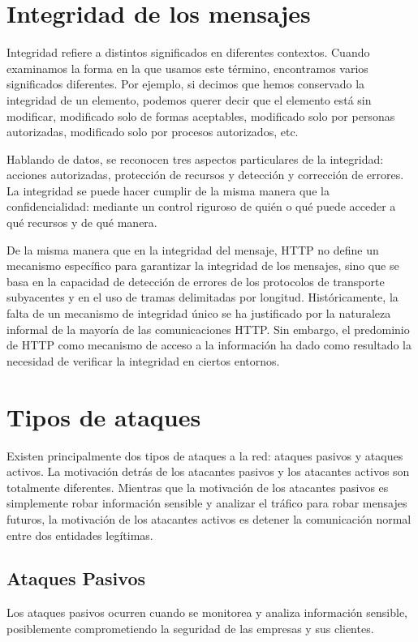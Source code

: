 \section{Integridad de los mensajes}
Integridad refiere a distintos significados en diferentes contextos. Cuando examinamos 
la forma en la que usamos este término, encontramos varios significados diferentes. 
Por ejemplo, si decimos que hemos conservado la integridad de un elemento, podemos 
querer decir que el elemento está sin modificar, modificado solo de formas aceptables, 
modificado solo por personas autorizadas, modificado solo por procesos autorizados, 
etc.

Hablando de datos, se reconocen tres aspectos particulares de la integridad: 
acciones autorizadas, protección de recursos y detección y corrección de errores. 
La integridad se puede hacer cumplir de la misma manera que la confidencialidad: 
mediante un control riguroso de quién o qué puede acceder a qué recursos y de qué 
manera.

De la misma manera que en la integridad del mensaje,
HTTP no define un mecanismo específico para garantizar la integridad de los 
mensajes, sino que se basa en la capacidad de detección de errores de los 
protocolos de transporte subyacentes y en el uso de tramas delimitadas por 
longitud. Históricamente, la falta de un mecanismo de integridad único se 
ha justificado por la naturaleza informal de la mayoría de las comunicaciones 
HTTP. Sin embargo, el predominio de HTTP como mecanismo de acceso a la 
información ha dado como resultado la necesidad de verificar la integridad
en ciertos entornos.


\section{Tipos de ataques}
Existen principalmente dos tipos de ataques a la red: ataques pasivos y 
ataques activos. La motivación detrás de los atacantes pasivos y los atacantes 
activos son totalmente diferentes. Mientras que la motivación de los atacantes 
pasivos es simplemente robar información sensible y analizar el tráfico para 
robar mensajes futuros, la motivación de los atacantes activos es detener la 
comunicación normal entre dos entidades legítimas.

\subsection{Ataques Pasivos}
Los ataques pasivos ocurren cuando se monitorea y analiza 
información sensible, posiblemente comprometiendo la seguridad de las 
empresas y sus clientes. 

